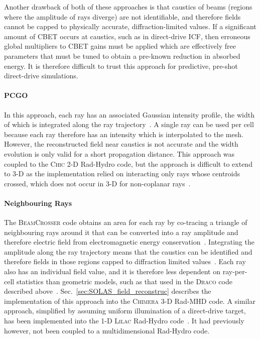 Another drawback of both of these approaches is that caustics of beams (regions where the amplitude of rays diverge) are not identifiable, and therefore fields cannot be capped to physically accurate, diffraction-limited values.
If a significant amount of \ac{CBET} occurs at caustics, such as in direct-drive \ac{ICF}, then erroneous global multipliers to \ac{CBET} gains must be applied which are effectively free parameters that must be tuned to obtain a pre-known reduction in absorbed energy.
It is therefore difficult to trust this approach for predictive, pre-shot direct-drive simulations.

\paragraph*{\ac{PCGO}} In this approach, each ray has an associated Gaussian intensity profile, the width of which is integrated along the ray trajectory~\cite{colaitis_towards_2014,colaitis_crossed_2016}.
A single ray can be used per cell because each ray therefore has an intensity which is interpolated to the mesh.
However, the reconstructed field near caustics is not accurate and the width evolution is only valid for a short propagation distance.
This approach was coupled to the \textsc{Chic} 2-D \ac{Rad-Hydro} code, but the approach is difficult to extend to 3-D as the implementation relied on interacting only rays whose centroids crossed, which does not occur in 3-D for non-coplanar rays~\cite{colaitis_modeling_2015}.

\paragraph*{Neighbouring Rays} The \textsc{BeamCrosser} code obtains an area for each ray by co-tracing a triangle of neighbouring rays around it that can be converted into a ray amplitude and therefore electric field from electromagnetic energy conservation~\cite{edgell_mitigation_2017}.
Integrating the amplitude along the ray trajectory means that the caustics can be identified and therefore fields in those regions capped to diffraction limited values~\cite{follett_ray-based_2018}.
Each ray also has an individual field value, and it is therefore less dependent on ray-per-cell statistics than geometric models, such as that used in the \textsc{Draco} code described above~\cite{follett_validation_2022}.
Sec.~\ref{sec:SOLAS_field_reconstruc} describes the implementation of this approach into the \textsc{Chimera} 3-D \ac{Rad-MHD} code.
A similar approach, simplified by assuming uniform illumination of a direct-drive target, has been implemented into the 1-D \textsc{Lilac} \ac{Rad-Hydro} code~\cite{igumenshchev_crossed-beam_2010, igumenshchev_crossed-beam_2012}.
It had previously however, not been coupled to a multidimensional \ac{Rad-Hydro} code.


